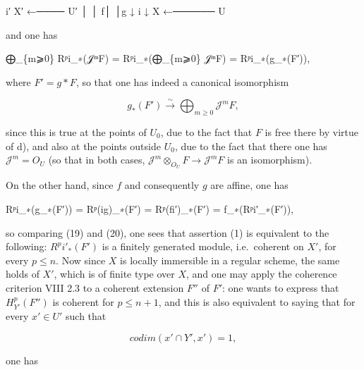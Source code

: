 \documentclass[
  11pt,
  a4paper,
]{book}
\newenvironment{Shaded}{}{}
\newcommand{\NormalTok}[1]{#1}
\begin{document}
\begin{Shaded}
\begin{Highlighting}[]
\NormalTok{       i′}
\NormalTok{X′ ←──── U′}
\NormalTok{│         │}
\NormalTok{f│         │g}
\NormalTok{↓    i    ↓}
\NormalTok{X ←────── U}
\end{Highlighting}
\end{Shaded}

and one has

\begin{Shaded}
\begin{Highlighting}[]
\NormalTok{⨁\_\{m⩾0\} Rᵖi\_∗(𝒥ᵐF) = Rᵖi\_∗(⨁\_\{m⩾0\} 𝒥ᵐF) = Rᵖi\_∗(g\_∗(F′)),}
\end{Highlighting}
\end{Shaded}

where \(F' = g*F\), so that one has indeed a canonical isomorphism

\[ g_{\ast}(F') \xrightarrow{\sim} \bigoplus_{m\geqslant 0} \mathcal{J}^{m}F, \]

since this is true at the points of \(U_{0}\), due to the fact that
\(F\) is free there by virtue of d), and also at the points outside
\(U_{0}\), due to the fact that there one has
\(\mathcal{J}^{m} = O_{U}\) (so that in both cases,
\(\mathcal{J}^{m} \otimes_{O_{U}} F \to \mathcal{J}^{m}F\) is an
isomorphism).

On the other hand, since \(f\) and consequently \(g\) are affine, one
has

\begin{Shaded}
\begin{Highlighting}[]
\NormalTok{Rᵖi\_∗(g\_∗(F′)) = Rᵖ(ig)\_∗(F′) = Rᵖ(fi′)\_∗(F′) = f\_∗(Rᵖi′\_∗(F′)),}
\end{Highlighting}
\end{Shaded}

so comparing (19) and (20), one sees that assertion (1) is equivalent to
the following: \(R^{p}i'_{\ast}(F')\) is a finitely generated module,
i.e.~coherent on \(X'\), for every \(p \leqslant n\). Now since \(X\) is
locally immersible in a regular scheme, the same holds of \(X'\), which
is of finite type over \(X\), and one may apply the coherence criterion
VIII 2.3 to a coherent extension \(F''\) of \(F'\): one wants to express
that \(H^{p}_{Y'}(F'')\) is coherent for \(p \leqslant n +
1\), and this is also equivalent to saying that for every \(x' \in U'\)
such that

\[ codim({x'} \cap Y', {x'}) = 1, \]

one has
\end{document}
